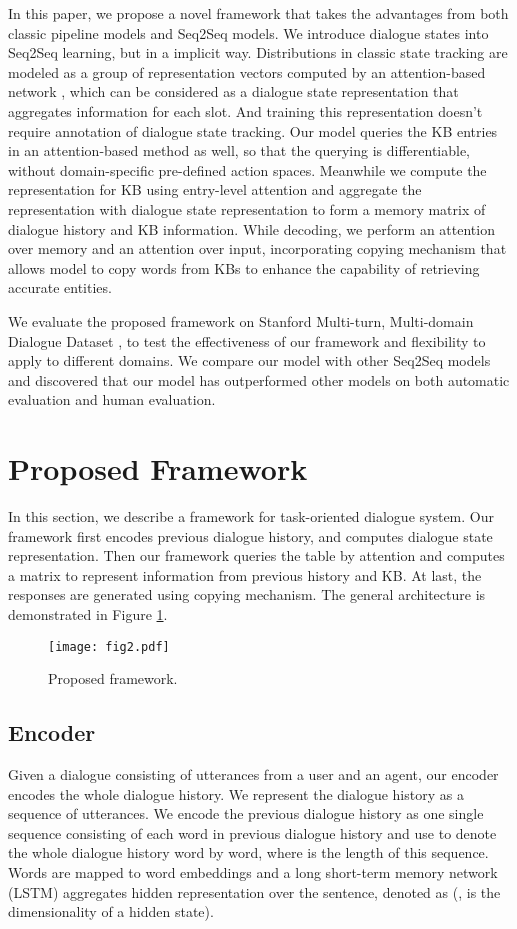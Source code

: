 \documentclass[11pt]{article}
\begin{document}
In this paper, we propose a novel framework that takes the advantages from both classic pipeline 
models and Seq2Seq models. We introduce dialogue states into 
Seq2Seq learning, but in a implicit way. Distributions in classic state tracking are modeled as a group of representation vectors computed by an attention-based network \cite{britz-guan-luong:2017:EMNLP},
which can be considered as a dialogue state representation that aggregates information for each slot. And training this representation doesn't require annotation of dialogue state tracking.
Our model queries the KB entries in an 
attention-based method as well, so that the querying is differentiable, without domain-specific pre-defined action spaces. Meanwhile we compute the representation for KB using entry-level attention and aggregate the representation with dialogue state representation to form a memory matrix of dialogue history and KB information.
While decoding, we perform an attention over memory and an attention over input, incorporating copying mechanism \cite{gu:2016:ACL} that allows model to copy words from KBs to enhance the capability of retrieving accurate entities.

We evaluate the proposed framework on Stanford Multi-turn, Multi-domain Dialogue Dataset 
\cite{eric:2017:SIGDial}, to test the effectiveness of our framework and flexibility to apply to different 
domains. We compare our model with other Seq2Seq models and discovered that our 
model has outperformed other models on both automatic evaluation and human evaluation.

\section{Proposed Framework}
In this section, we describe a framework for task-oriented dialogue system. 
Our framework first encodes previous dialogue history, and computes dialogue state representation. 
Then our framework queries the table by attention and computes a matrix to represent information from previous history and KB. 
At last, the responses are generated using copying mechanism. 
The general architecture is demonstrated in Figure \ref{fig22}. 
\begin{figure}[!tp]
\label{fig22}
 \texttt{[image: fig2.pdf]}
 \caption{Proposed framework.}
\end{figure}
\subsection{Encoder}
Given a dialogue consisting of utterances from a user and an agent, our encoder encodes the whole dialogue history. We represent the dialogue history
as a sequence of utterances. We encode the previous dialogue history as one single sequence 
consisting of each word in previous dialogue history and use  to denote the whole dialogue history word by word, where  is the length of this sequence. Words are 
mapped to word embeddings and a long short-term memory network (LSTM) aggregates hidden representation 
over the sentence, denoted as  (,  is the dimensionality of a hidden state).
\end{document}
